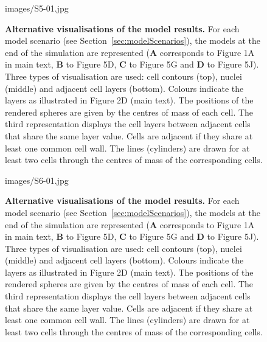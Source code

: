 \begin{figure}[htbp]
\centering
	\begin{overpic}[width=0.8\linewidth]{images/S5-01.jpg}
	\end{overpic}
\caption[Alternative visualisations of the model results.]
{{\bf Alternative visualisations of the model results.} For each model scenario (see Section~\ref{sec:modelScenarios}), the models at the end of the simulation are represented (\textbf{A} corresponds to Figure 1A in main text, \textbf{B} to Figure 5D, \textbf{C} to Figure 5G and \textbf{D} to Figure 5J). Three types of visualisation are used: cell contours (top), nuclei (middle) and adjacent cell layers (bottom). Colours indicate the layers as illustrated in Figure 2D (main text). The positions of the rendered spheres are given by the centres of mass of each cell. The third representation displays the cell layers between adjacent cells that share the same layer value. Cells are adjacent if they share at least one common cell wall. The lines (cylinders) are drawn for at least two cells through the centres of mass of the corresponding cells.
}
\label{fig:S5}
\end{figure}
%
\clearpage
%
\begin{figure}[htbp]
\centering
	\begin{overpic}[width=0.8\linewidth]{images/S6-01.jpg}
	\end{overpic}
\caption[Alternative visualisations of the model results.]
{{\bf Alternative visualisations of the model results.} For each model scenario (see Section~\ref{sec:modelScenarios}), the models at the end of the simulation are represented (\textbf{A} corresponds to Figure 1A in main text, \textbf{B} to Figure 5D, \textbf{C} to Figure 5G and \textbf{D} to Figure 5J). Three types of visualisation are used: cell contours (top), nuclei (middle) and adjacent cell layers (bottom). Colours indicate the layers as illustrated in Figure 2D (main text). The positions of the rendered spheres are given by the centres of mass of each cell. The third representation displays the cell layers between adjacent cells that share the same layer value. Cells are adjacent if they share at least one common cell wall. The lines (cylinders) are drawn for at least two cells through the centres of mass of the corresponding cells.
}
\label{fig:S6}
\end{figure}
%
\clearpage



